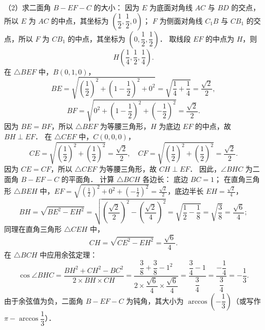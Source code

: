 \begin{answer}
（2）求二面角 $B - EF - C$ 的大小：
因为 $E$ 为底面对角线 $AC$ 与 $BD$ 的交点，所以 $E$ 为 $AC$ 的中点，其坐标为 $\left(\dfrac{1}{2}, \dfrac{1}{2}, 0\right)$；
$F$ 为侧面对角线 $C_1B$ 与 $CB_1$ 的交点，所以 $F$ 为 $CB_1$ 的中点，其坐标为 $\left(0, \dfrac{1}{2}, \dfrac{1}{2}\right)$．
取线段 $EF$ 的中点为 $H$，则
\nopagebreak[4]
\[
H\left(\frac{1}{4}, \frac{1}{2}, \frac{1}{4}\right).
\]
在 $\triangle BEF$ 中，$B(0, 1, 0)$，
\nopagebreak[4]
\[
BE = \sqrt{\left(\frac{1}{2}\right)^2 + \left(1 - \frac{1}{2}\right)^2 + 0^2} = \sqrt{\frac{1}{4} + \frac{1}{4}} = \frac{\sqrt{2}}{2},
\]
\nopagebreak[4]
\[
BF = \sqrt{0^2 + \left(1 - \frac{1}{2}\right)^2 + \left(-\frac{1}{2}\right)^2} = \frac{\sqrt{2}}{2}.
\]
因为 $BE = BF$，所以 $\triangle BEF$ 为等腰三角形，$H$ 为底边 $EF$ 的中点，故 $BH \perp EF$．
在 $\triangle CEF$ 中，$C(0, 0, 0)$，
\nopagebreak[4]
\[
CE = \sqrt{\left(\frac{1}{2}\right)^2 + \left(\frac{1}{2}\right)^2} = \frac{\sqrt{2}}{2}, \quad CF = \sqrt{\left(\frac{1}{2}\right)^2 + \left(\frac{1}{2}\right)^2} = \frac{\sqrt{2}}{2}.
\]
因为 $CE = CF$，所以 $\triangle CEF$ 为等腰三角形，故 $CH \perp EF$．
因此，$\angle BHC$ 为二面角 $B - EF - C$ 的平面角．
计算 $\triangle BCH$ 各边长：
底边 $BC = 1$；
在直角三角形 $\triangle BEH$ 中，$EF = \sqrt{\left(\frac{1}{2}\right)^2 + 0^2 + \left(-\frac{1}{2}\right)^2} = \frac{\sqrt{2}}{2}$，底边半长 $EH = \frac{\sqrt{2}}{4}$，
\nopagebreak[4]
\[
BH = \sqrt{BE^2 - EH^2} = \sqrt{\left(\frac{\sqrt{2}}{2}\right)^2 - \left(\frac{\sqrt{2}}{4}\right)^2} = \sqrt{\frac{1}{2} - \frac{1}{8}} = \sqrt{\frac{3}{8}} = \frac{\sqrt{6}}{4};
\]
同理在直角三角形 $\triangle CEH$ 中，
\nopagebreak[4]
\[
CH = \sqrt{CE^2 - EH^2} = \frac{\sqrt{6}}{4}.
\]
在 $\triangle BCH$ 中应用余弦定理：
\nopagebreak[4]
\[
\cos\angle BHC = \frac{BH^2 + CH^2 - BC^2}{2 \times BH \times CH} = \frac{\dfrac{3}{8} + \dfrac{3}{8} - 1^2}{2 \times \dfrac{\sqrt{6}}{4} \times \dfrac{\sqrt{6}}{4}} = \frac{\dfrac{3}{4} - 1}{\dfrac{3}{4}} = \frac{-\dfrac{1}{4}}{\dfrac{3}{4}} = -\frac{1}{3}.
\]
由于余弦值为负，二面角 $B - EF - C$ 为钝角，其大小为 $\arccos\left(-\dfrac{1}{3}\right)$（或写作 $\pi - \arccos\dfrac{1}{3}$）．


\end{answer}
